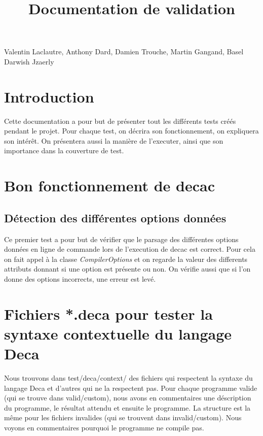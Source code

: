 \documentclass[12pt, a4paper, one side]{article}
\title{Documentation de validation}
\author{}
\date{}
\begin{document}
\maketitle

\begin{center}
    Valentin Laclautre, Anthony Dard, Damien Trouche, Martin Gangand, Basel Darwish Jzaerly
\end{center}

\tableofcontents

\newpage

\section{Introduction}

Cette documentation a pour but de présenter tout les différents tests créés pendant le projet.
Pour chaque test, on décrira son fonctionnement, on expliquera son intérêt. On présentera aussi
la manière de l'executer, ainsi que son importance dans la couverture de test.

\section{Bon fonctionnement de decac}

\subsection{Détection des différentes options données}

Ce premier test a pour but de vérifier que le parsage des différentes options données en ligne
de commande lors de l'execution de decac est correct. Pour cela on fait appel à la classe \textit{CompilerOptions}
et on regarde la valeur des differents attributs donnant si une option est présente ou non. On vérifie aussi que si l'on
donne des options incorrects, une erreur est levé.

\section{Fichiers *.deca pour tester la syntaxe contextuelle du langage Deca}
Nous trouvons dans test/deca/context/ des fichiers qui respectent la syntaxe du langage Deca et d'autres qui ne la respectent pas.
Pour chaque programme valide (qui se trouve dans valid/custom), nous avons en commentaires une déscription du programme,
le résultat attendu et ensuite le programme.
La structure est la même pour les fichiers invalides (qui se trouvent dans invalid/custom). Nous voyons en commentaires pourquoi le programme ne compile pas.
    
\end{document}

